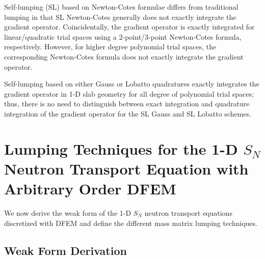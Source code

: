 Self-lumping (SL) based on Newton-Cotes formulae differs from traditional lumping in that SL Newton-Cotes generally does not exactly integrate the gradient operator.  
Coincidentally, the gradient operator is exactly integrated for linear/quadratic trial spaces using a 2-point/3-point Newton-Cotes formula, respectively. However, for higher degree polynomial trial spaces, the corresponding Newton-Cotes formula does not exactly integrate the gradient operator.  

Self-lumping based on either Gauss or Lobatto quadratures exactly integrates the gradient operator in 1-D slab geometry for all degree of polynomial trial spaces; 
thus, there is no need to distinguish between exact integration and quadrature integration of the gradient operator for the SL Gauss and SL Lobatto schemes.


\section{Lumping Techniques for the 1-D $S_N$ Neutron Transport Equation with Arbitrary Order DFEM}
\label{sec:derivation}

We now derive the weak form of the 1-D $S_N$ neutron transport equations discretized with DFEM and define the different mass matrix lumping techniques.

\subsection{Weak Form Derivation}
\label{sec:derive}

